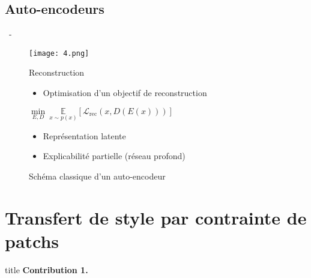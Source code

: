 \documentclass[aspectratio=169, 22pt]{beamer}
\begin{document}
\subsection{Auto-encodeurs}
\begin{frame}{\secname~- \subsecname}
  \begin{figure}
    \centering
    \texttt{[image: 4.png]}
    \caption{Schéma classique d'un auto-encodeur}
    \begin{block}{Reconstruction}
      \centering
      \begin{itemize}
      \item Optimisation d'un objectif de reconstruction
      \end{itemize}
      $\underset{E,D}{\min}\ \underset{x \sim p(x)}{\mathbb{E}}\left[\mathcal{L}_{\text{rec}}(x,D(E(x)))\right]$
      \begin{itemize}        
      \item Représentation \alert{latente}
      \item Explicabilité partielle (réseau profond)
      \end{itemize}

    \end{block}
  \end{figure}
  
\end{frame}

\section{Transfert de style par contrainte de patchs}
\begin{frame}
  \begin{beamercolorbox}[sep=15pt,center,shadow=true,rounded=true]{title}
    \LARGE\bfseries Contribution 1.\\ \secname
  \end{beamercolorbox}
\end{frame}
\end{document}
